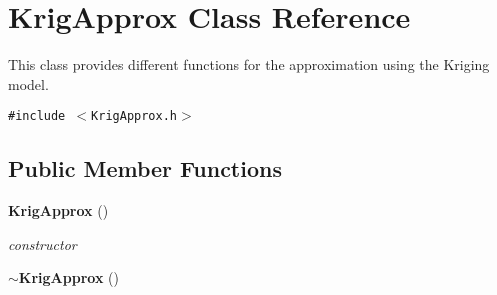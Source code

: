 \section{Krig\-Approx Class Reference}
\label{classKrigApprox}
This class provides different functions for the approximation using the Kriging model.  


{\tt \#include $<$Krig\-Approx.h$>$}

\subsection*{Public Member Functions}
\begin{CompactItemize}
\item 
{\bf Krig\-Approx} ()\label{classKrigApprox_a0}

\begin{CompactList}\small\item\em constructor \item\end{CompactList}\item 
{\bf $\sim$Krig\-Approx} ()\label{classKrigApprox_a1}


\end{CompactItemize}
